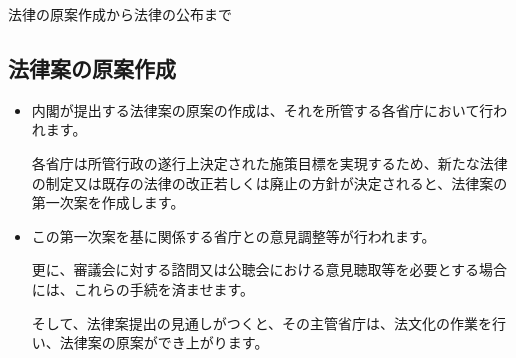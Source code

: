 \begin {center}
  法律の原案作成から法律の公布まで\\
\end {center}

\subsection {法律案の原案作成}
\begin {itemize}
\item 内閣が提出する法律案の原案の作成は、それを所管する各省庁において行われます。\par
  各省庁は所管行政の遂行上決定された施策目標を実現するため、新たな法律の制定又は既存の法律の改正若しくは廃止の方針が決定されると、法律案の第一次案を作成します。\par

\item この第一次案を基に関係する省庁との意見調整等が行われます。\par
  更に、審議会に対する諮問又は公聴会における意見聴取等を必要とする場合には、これらの手続を済ませます。\par
  そして、法律案提出の見通しがつくと、その主管省庁は、法文化の作業を行い、法律案の原案ができ上がります。\par
\end {itemize}

